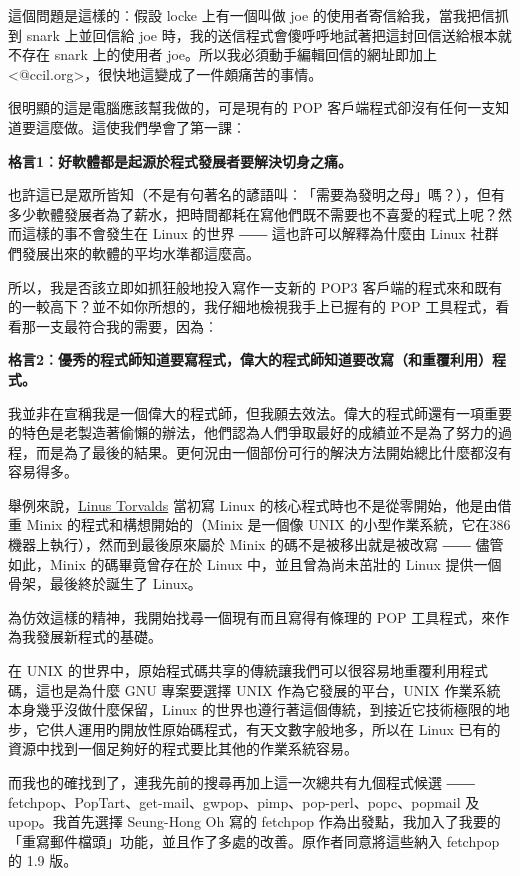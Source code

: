 \documentclass[12pt, a5paper]{book}
\begin{document}
這個問題是這樣的︰假設 locke 上有一個叫做 joe
的使用者寄信給我，當我把信抓到 snark 上並回信給 joe
時，我的送信程式會傻呼呼地試著把這封回信送給根本就不存在 snark
上的使用者 joe。所以我必須動手編輯回信的網址即加上
\textless{}@ccil.org\textgreater{}，很快地這變成了一件頗痛苦的事情。

很明顯的這是電腦應該幫我做的，可是現有的 POP
客戶端程式卻沒有任何一支知道要這麼做。這使我們學會了第一課︰

\textbf{格言1︰好軟體都是起源於程式發展者要解決切身之痛。}

也許這已是眾所皆知（不是有句著名的諺語叫︰「需要為發明之母」嗎？），但有多少軟體發展者為了薪水，把時間都耗在寫他們既不需要也不喜愛的程式上呢？然而這樣的事不會發生在
Linux 的世界 ―― 這也許可以解釋為什麼由 Linux
社群們發展出來的軟體的平均水準都這麼高。

所以，我是否該立即如抓狂般地投入寫作一支新的 POP3
客戶端的程式來和既有的一較高下？並不如你所想的，我仔細地檢視我手上已握有的
POP 工具程式，看看那一支最符合我的需要，因為︰

\textbf{格言2︰優秀的程式師知道要寫程式，偉大的程式師知道要改寫（和重覆利用）程式。}

我並非在宣稱我是一個偉大的程式師，但我願去效法。偉大的程式師還有一項重要的特色是老製造著偷懶的辦法，他們認為人們爭取最好的成績並不是為了努力的過程，而是為了最後的結果。更何況由一個部份可行的解決方法開始總比什麼都沒有容易得多。

舉例來說，\href{http://www.tuxedo.org/~esr/faqs/linus}{Linus Torvalds}
當初寫 Linux 的核心程式時也不是從零開始，他是由借重 Minix
的程式和構想開始的（Minix 是一個像 UNIX
的小型作業系統，它在386機器上執行），然而到最後原來屬於 Minix
的碼不是被移出就是被改寫 ―― 儘管如此，Minix 的碼畢竟曾存在於 Linux
中，並且曾為尚未茁壯的 Linux 提供一個骨架，最後終於誕生了 Linux。

為仿效這樣的精神，我開始找尋一個現有而且寫得有條理的 POP
工具程式，來作為我發展新程式的基礎。

在 UNIX
的世界中，原始程式碼共享的傳統讓我們可以很容易地重覆利用程式碼，這也是為什麼
GNU 專案要選擇 UNIX 作為它發展的平台，UNIX
作業系統本身幾乎沒做什麼保留，Linux
的世界也遵行著這個傳統，到接近它技術極限的地步，它供人運用旳開放性原始碼程式，有天文數字般地多，所以在
Linux 已有的資源中找到一個足夠好的程式要比其他的作業系統容易。

而我也的確找到了，連我先前的搜尋再加上這一次總共有九個程式候選 ――
fetchpop、PopTart、get-mail、gwpop、pimp、pop-perl、popc、popmail 及
upop。我首先選擇 Seung-Hong Oh 寫的 fetchpop
作為出發點，我加入了我要的「重寫郵件檔頭」功能，並且作了多處的改善。原作者同意將這些納入
fetchpop 的 1.9 版。
\end{document}

